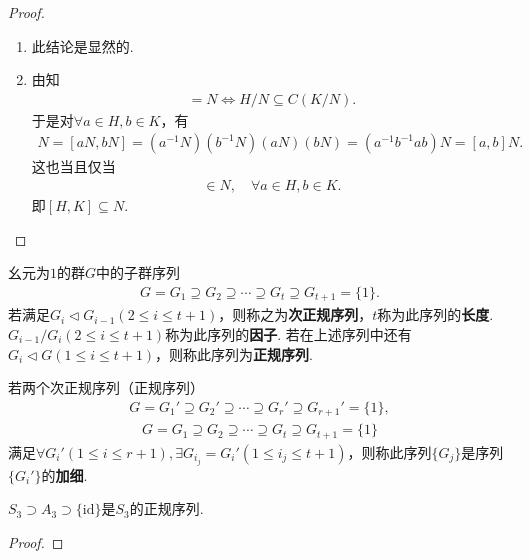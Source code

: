 \documentclass[../../main.tex]{subfiles}%
\begin{document}
\begin{proof}
\begin{enumerate}[(1)]
当$H\cap K\{1\}$时,有$[H,K]=1$,再由(1)可知$H\subseteq C_G(K)$,即$H$与$K$可换.

\item 此结论是显然的.

\item 由知
\begin{align*}
[H/N,K/N] = N \Longleftrightarrow H/N \subseteq C(K/N).
\end{align*}
于是对$\forall a\in H,b\in K$，有
\begin{align*}
N = [aN,bN] = (a^{-1}N)(b^{-1}N)(aN)(bN) = (a^{-1}b^{-1}ab)N = [a,b]N.
\end{align*}
这也当且仅当
\begin{align*}
[a,b] \in N,\quad \forall a\in H,b\in K.
\end{align*}
即$[H,K] \subseteq N$.
\end{enumerate}
\end{proof}

\begin{definition}
幺元为$1$的群$G$中的子群序列
\begin{align*}
G = G_1 \supseteq G_2 \supseteq \cdots \supseteq G_t \supseteq G_{t+1} = \{1\}.
\end{align*}
若满足$G_i \lhd G_{i-1}(2 \leqslant i \leqslant t+1)$，则称之为\textbf{次正规序列}，$t$称为此序列的\textbf{长度}.$G_{i-1}/G_i(2 \leqslant i \leqslant t+1)$称为此序列的\textbf{因子}.
若在上述序列中还有$G_i \lhd G(1 \leqslant i \leqslant t+1)$，则称此序列为\textbf{正规序列}.

若两个次正规序列（正规序列）
\begin{align*}
G = G_1' \supseteq G_2' \supseteq \cdots \supseteq G_r' \supseteq G_{r+1}' = \{1\},
\end{align*}
\begin{align*}
G = G_1 \supseteq G_2 \supseteq \cdots \supseteq G_t \supseteq G_{t+1} = \{1\}
\end{align*}
满足$\forall G_i'(1 \leqslant i \leqslant r+1), \exists G_{i_j} = G_i'(1 \leqslant i_j \leqslant t+1)$，则称此序列$\{G_j\}$是序列$\{G_i'\}$的\textbf{加细}.
\end{definition}

\begin{example}
$S_3 \supset A_3 \supset \{\mathrm{id}\}$是$S_3$的正规序列.
\end{example}
\begin{proof}



\end{proof}
\end{document}
